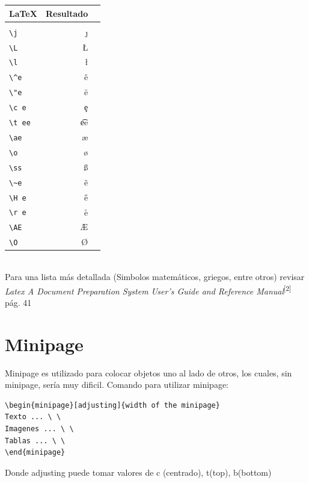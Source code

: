 \documentclass[10pt,journal,compsoc]{IEEEtran}
\begin{document}
	\begin{minipage}{0.1\textwidth}
		\begin{tabular}{ l r r }
			\LaTeX & Resultado \\
			\hline\\
			\verb|\j| & \j \\
			\verb|\L| & \L \\
			\verb|\l| & \l \\
			\verb|\^e| & \^e \\
			\verb|\"e| & \"e \\
			\verb|\c e| & \c e \\
			\verb|\t ee|& \t ee \\
			\verb|\ae| & \ae \\
			\verb|\o| & \o \\
			\verb|\ss| & \ss \\
			\verb|\~e| & \~e \\
			\verb|\H e| & \H e \\
			\verb|\r e| & \r e \\
			\verb|\AE| & \AE \\
			\verb|\O|& \O \\
		\end{tabular}
		\hfill
	\end{minipage}\\
	Para una lista m\'as detallada (Simbolos matem\'aticos, griegos, entre otros) revisar \emph{Latex A Document Preparation System User's Guide and Reference Manual}\textsuperscript{[2]} p\'ag. 41

\section{Minipage}%
Minipage es utilizado para colocar objetos uno al lado de otros, los cuales, sin minipage, ser\'ia muy dificil.
Comando para utilizar minipage:
\begin{lstlisting}
\begin{minipage}[adjusting]{width of the minipage}
Texto ... \ \
Imagenes ... \ \
Tablas ... \ \
\end{minipage}
\end{lstlisting}
Donde adjusting puede tomar valores de c (centrado), t(top), b(bottom)
\end{document}
